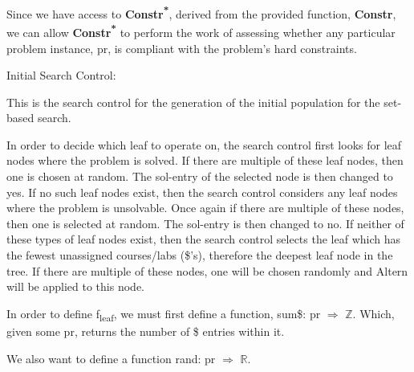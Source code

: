 \documentclass[11pt, oneside]{article}   	%
\newenvironment{cmr}{\fontfamily{cmr}\selectfont}{\par}
\begin{document}
\noindent Since we have access to \textbf{Constr\textsuperscript{*}}, derived from the provided function, \textbf{Constr}, we can allow \textbf{Constr\textsuperscript{*}} to perform the work of assessing whether any particular problem instance, pr, is compliant with the problem's hard constraints.


\begin{cmr}
\noindent Initial Search Control:
\begin{comment}
\noindent Our O\textsubscript{Tree} will obviously begin with a single node, (pr, ?). Its expansion will be governed by the recursive relation, Erw\textsubscript{$\lor$}.
After each application of Altern, the search control will perform a constraint analysis on each new successor node of O\textsubscript{Tree} using \textbf{Constr\textsuperscript{*}}.
\end{comment}

\noindent This is the search control for the generation of the initial population for the set-based search.

\noindent In order to decide which leaf to operate on, the search control first looks for leaf nodes where the problem is solved. If there are multiple of these leaf nodes, then one is chosen at random. The sol-entry of the selected node is then changed to yes.
If no such leaf nodes exist, then the search control considers any leaf nodes where the problem is unsolvable. Once again if there are multiple of these nodes, then one is selected at random. The sol-entry is then changed to no. If neither of these types of leaf nodes exist, then the search control selects the leaf which has the fewest unassigned courses/labs (\$'s), therefore the deepest leaf node in the tree. 
If there are multiple of these nodes, one will be chosen randomly and Altern will be applied to this node.

\end{cmr}
\begin{comment}
\noindent The search control will pick a random leaf from among the minimal f\textsubscript{leaf} values.
\end{comment}

\noindent In order to define f\textsubscript{leaf}, we must first define a function, sum\$: pr $\Rightarrow$ $\mathbb{Z}$. Which, given some pr, returns the number of \$ entries within it. 

\noindent We also want to define a function rand: pr $\Rightarrow$ $\mathbb{R}$. 
\end{document}

